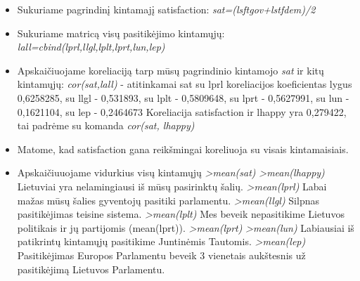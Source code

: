 \documentclass[a4paper]{article}
\begin{document}
\begin{enumerate}
\begin{itemize}
\item Sukuriame pagrindinį kintamajį satisfaction:
\newline 
\textit{sat=(lsftgov+lstfdem)/2}
\item Sukuriame matricą visų pasitikėjimo kintamųjų:
\newline \textit {lall=cbind(lprl,llgl,lplt,lprt,lun,lep)}
\item Apskaičiuojame koreliaciją tarp mūsų pagrindinio kintamojo \textit{sat} ir kitų kintamųjų:
\newline  \textit{cor(sat,lall)}  -  atitinkamai sat su lprl koreliacijos koeficientas lygus 0,6258285,  su  llgl -  0,531893, su lplt - 0,5809648, su lprt - 0,5627991, su lun - 0,1621104, su lep - 0,2464673
\newline Koreliacija satisfaction ir  lhappy yra 0,279422, tai padrėme su komanda 
\newline \textit{cor(sat, lhappy)}
\item Matome, kad satisfaction gana reikšmingai koreliuoja su visais kintamaisiais.

\item Apskaičiuuojame vidurkius visų kintamųjų
\newline \textit{ >mean(sat) 
   }
\newline \textit{ >mean(lhappy) 
   }
\newline Lietuviai yra nelamingiausi iš mūsų pasirinktų šalių.
\newline \textit{ >mean(lprl) 
   }
\newline Labai mažas mūsų šalies gyventojų pasitiki parlamentu.
\newline \textit{ >mean(llgl) 
   }
\newline Silpnas pasitikėjimas teisine sistema.
\newline \textit{ >mean(lplt) 
   }
\newline Mes beveik nepasitikime Lietuvos politikais ir jų partijomis (mean(lprt)).
\newline \textit{ >mean(lprt) 
   }
\newline \textit{ >mean(lun) 
   }
\newline Labiausiai iš patikrintų kintamųjų pasitikime Juntinėmis Tautomis.
\newline \textit{ >mean(lep) 
   }
\newline Pasitikėjimas Europos Parlamentu beveik 3 vienetais aukštesnis už pasitikėjimą Lietuvos Parlamentu.


\end{itemize}
\end{enumerate}
\end{document}
